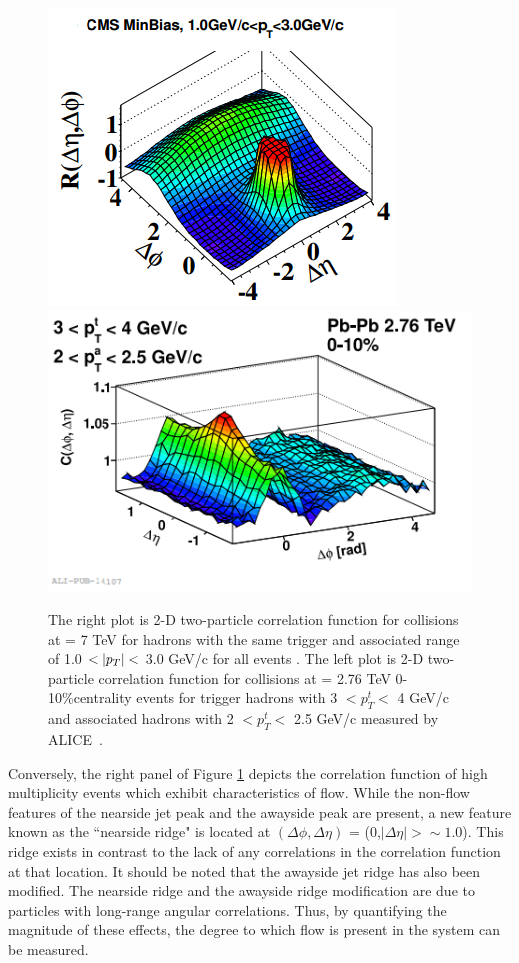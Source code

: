\begin{figure}[!ht]
\begin{center}
\includegraphics[width=0.43\linewidth]{figs/pp_correlation_function_min_bias.png}
\includegraphics[width=0.48\linewidth]{figs/pbpb_correlation_function_010.png}
\caption{The right plot is 2-D two-particle correlation function for \pp collisions at \sqsn = 7 TeV for hadrons with the same trigger and associated \pt range of 1.0 $<|\pt|<$ 3.0 GeV/c for all events \cite{Khachatryan2010}. The left plot is 2-D two-particle correlation function for \pbpb collisions at \sqsn = 2.76 TeV 0-10\%centrality events for trigger hadrons with 3 $<p_T^t<$ 4 GeV/c and associated hadrons with 2 $<p_T^t<$ 2.5 GeV/c measured by ALICE~\cite{Khachatryan2010}.}
\label{fig:corr_function_example}
\end{center}
\end{figure}

Conversely, the right panel of Figure \ref{fig:corr_function_example} depicts the correlation function of high multiplicity \pbpb events which exhibit characteristics of flow. 
While the non-flow features of the nearside jet peak and the awayside peak are present, a new feature known as the ``nearside ridge" is located at $(\Delta\phi,\Delta\eta)$ = (0,$|\Delta\eta|> \sim1.0$). This ridge exists in contrast to the lack of any correlations in the \pp correlation function at that location. It should be noted that the awayside jet ridge has also been modified. The nearside ridge and the awayside ridge modification are due to particles with long-range angular correlations. Thus, by quantifying the magnitude of these effects, the degree to which flow is present in the system can be measured.

